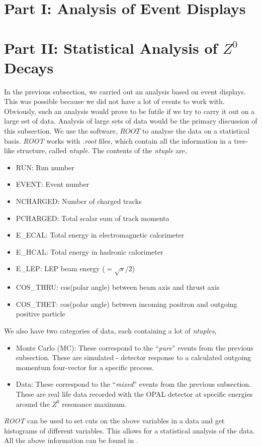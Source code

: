 \section{Part I: Analysis of Event Displays}

\section{Part II: Statistical Analysis of $Z^0$ Decays}
In the previous subsection, we carried out an analysis based on event displays. This was possible because we did not have a lot of events to work with. Obviously, such an analysis would prove to be futile if we try to carry it out on a large set of data. Analysis of large sets of data would be the primary discussion of this subsection. We use the software, $ROOT$ to analyse the data on a statistical basis. \textit{ROOT} works with \textit{.root} files, which contain all the information in a tree-like structure, called \textit{ntuple}. The contents of the \textit{ntuple} are,
\begin{itemize}
    \item RUN: Run number
    \item EVENT: Event number
    \item NCHARGED: Number of charged tracks
    \item PCHARGED: Total scalar sum of track momenta
    \item E\_ECAL: Total energy in electromagnetic calorimeter
    \item E\_HCAL: Total energy in hadronic calorimeter
    \item E\_LEP: LEP beam energy ($=\sqrt{s}/2$)
    \item COS\_THRU: cos(polar angle) between beam axis and thrust axis
    \item COS\_THET: cos(polar angle) between incoming positron and outgoing positive particle
\end{itemize}
We also have two categories of data, each containing a lot of \textit{ntuples},
\begin{itemize}
    \item Monte Carlo (MC): These correspond to the ``\textit{pure}'' events from the previous subsection. These are simulated - detector response to a calculated outgoing momentum four-vector for a specific process.
    \item Data: These correspond to the ``\textit{mixed}'' events from the previous subsection. These are real life data recorded with the OPAL detector at specific energies around the $Z^0$ resonance maximum.
\end{itemize}
\textit{ROOT} can be used to set cuts on the above variables in a data and get histograms of different variables. This allows for a statistical analysis of the data. All the above information can be found in \cite{UB}.

